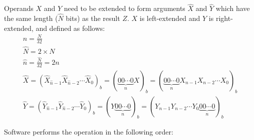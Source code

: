 \documentclass[main\_\_EN.tex]{subfiles}
\begin{document}
Operands \begin{math}X\end{math} and \begin{math}Y\end{math} need to be extended to form arguments \begin{math}\hat{X}\end{math} and \begin{math}\hat{Y}\end{math} which have the same length (\begin{math}\hat{N}\end{math} bits) as the result \begin{math}Z\end{math}. \begin{math}X\end{math} is left-extended and \begin{math}Y\end{math} is right-extended, and defined as follows:
\begin{gather*}
    n = \frac{N}{32} \\
    \hat{N} = 2 \times N\\
    \hat{n} = \frac{\hat{N}}{32} = 2n\\
    \hat{X}
        = ( \hat{X}_{\hat{n}-1} \hat{X}_{\hat{n}-2} \cdots \hat{X}_{0} )_{b}
        = ( \underbrace{0 0 \cdots 0}_{n}
            X )_{b}
        = ( \underbrace{0 0 \cdots 0}_{n}
            X_{n-1} X_{n-2} \cdots X_{0} )_{b} \\
    \hat{Y}
        = ( \hat{Y}_{\hat{n}-1} \hat{Y}_{\hat{n}-2} \cdots \hat{Y}_{0} )_{b}
        = ( Y
            \underbrace{0 0 \cdots 0}_{n} )_{b}
        = ( Y_{n-1} Y_{n-2} \cdots Y_{0}
            \underbrace{0 0 \cdots 0}_{n} )_{b}
\end{gather*}

Software performs the operation in the following order:
\end{document}
